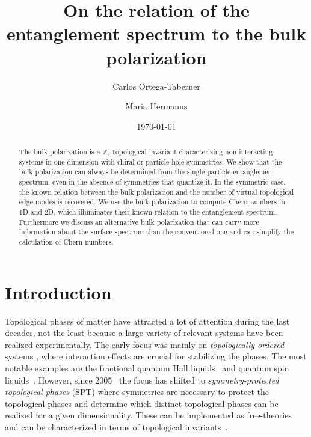 \documentclass[twocolumn,amsmath,longbibliography,amssymb,superscriptaddress]{revtex4-1}
\begin{document}
		
\title{On the relation of the entanglement spectrum to the bulk polarization}
\author{Carlos Ortega-Taberner}

\author{Maria Hermanns}
\date{\today}
\begin{abstract}
The bulk polarization is a $\mathbb{Z}_2$ topological invariant characterizing non-interacting systems in one dimension with chiral or particle-hole symmetries. We show that the bulk polarization can always be determined from the single-particle entanglement spectrum, even in the absence of symmetries that quantize it. In the symmetric case, the known relation between the bulk polarization and the number of virtual topological edge modes is recovered. We use the bulk polarization to compute Chern numbers in 1D and 2D, which illuminates their known relation to the entanglement spectrum. Furthermore we discuss an alternative bulk polarization that can carry more information about the surface spectrum than the conventional one and can simplify the calculation of Chern numbers. 
\end{abstract}

\maketitle
	


\section{Introduction}
Topological phases of matter have attracted a lot of attention during the last decades, not the least because a large variety of relevant systems have been realized experimentally. 
The early focus was mainly on \emph{topologically ordered} systems \cite{wenbook}, where interaction effects are crucial for stabilizing the phases. 
The most notable examples are the fractional quantum Hall liquids~\cite{Tsui1982} and quantum spin liquids~\cite{Balents2010spin}. 
However, since 2005~\cite{kane2005quantum, roy2009topological} the focus has shifted to  \emph{symmetry-protected topological phases} (SPT) where symmetries are necessary to protect the topological phases and determine which distinct topological phases can be realized for a given dimensionality. These can be implemented as free-theories and can be characterized in terms of topological invariants~\cite{ryu2010topological}. 
\end{document}
